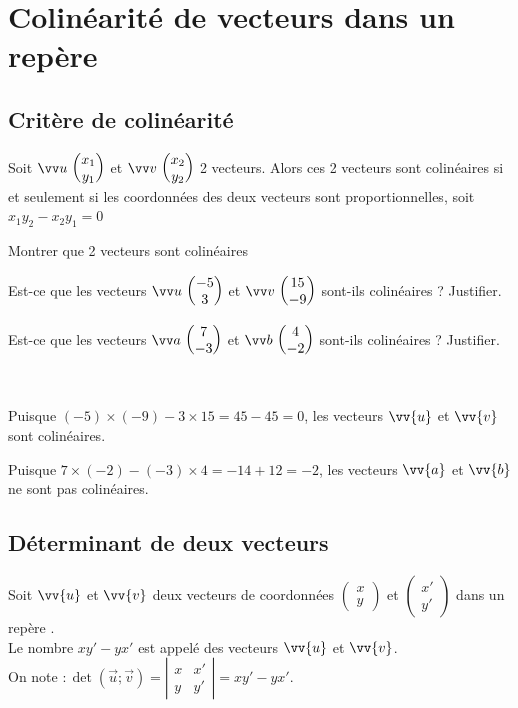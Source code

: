 \documentclass[11pt,a4paper]{article}  %
\begin{document}
\section{Colinéarité de vecteurs dans un repère}

\subsection{Critère de colinéarité}

\begin{bprop}
	Soit $\Coord{u}{x_1}{y_1}$ et $\Coord{v}{x_2}{y_2}$ 2 vecteurs. Alors ces 2 vecteurs sont colinéaires si et seulement si les coordonnées des deux vecteurs sont proportionnelles, soit $x_{1} y_{2}-x_{2} y_{1}=0$
\end{bprop}

\begin{bmethodet}{Montrer que 2 vecteurs sont colinéaires}
	\begin{enumMet}
		\item Est-ce que les vecteurs $\Coord{u}{-5}{3}$ et $\Coord{v}{15}{-9}$ sont-ils colinéaires ? Justifier.
		\item Est-ce que les vecteurs $\Coord{a}{7}{-3}$  et $\Coord{b}{4}{-2}$ sont-ils colinéaires ? Justifier.
	\end{enumMet}
	\\
	\begin{enumMet}
		\item Puisque $(-5) \times(-9)-3 \times 15=45-45=0$, les vecteurs $\vv{u}$ et $\vv{v}$ sont colinéaires. 
		\item Puisque $7 \times(-2)-(-3) \times 4=-14+12=-2$, les vecteurs $\vv{a}$ et $\vv{b}$ ne sont pas colinéaires.
	\end{enumMet}
\end{bmethodet}

\subsection{Déterminant de deux vecteurs}

\begin{bdefi}
	Soit $\vv{u}$ et $\vv{v}$ deux vecteurs de coordonnées $\left(\begin{array}{l}x \\ y\end{array}\right)$ et $\left(\begin{array}{l}x' \\ y'\end{array}\right)$ dans un repère \Rij.\\
	Le nombre $x y'-y x'$ est appelé  des vecteurs $\vv{u}$ et $\vv{v}$.\\
	On note $: \operatorname{det}(\vec{u} ; \vec{v})=\left|\begin{array}{ll}x & x' \\ y & y'\end{array}\right|=x y'-y x'$.
\end{bdefi}
\end{document}
